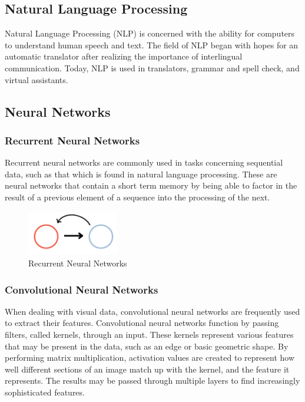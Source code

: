 \documentclass[11pt, a4paper, twocolumn]{article}
\begin{document}
\subsection{Natural Language Processing}
Natural Language Processing (NLP) is concerned with the ability for computers to understand human speech and text. The field of NLP began with hopes for an automatic translator after realizing the importance of interlingual communication. Today, NLP is used in translators, grammar and spell check, and virtual assistants. 

\subsection{Neural Networks}
\subsubsection{Recurrent Neural Networks}
Recurrent neural networks are commonly used in tasks concerning sequential data, such as that which is found in natural language processing. These are neural networks that contain a short term memory by being able to factor in the result of a previous element of a sequence into the processing of the next. 

\begin{figure}[htp]
    \centering
    \includegraphics[width=4cm]{rnn.png}
    \caption{Recurrent Neural Networks}
    \label{fig:rnn}
\end{figure}

\subsubsection{Convolutional Neural Networks}
When dealing with visual data, convolutional neural networks are frequently used to extract their features. Convolutional neural networks function by passing filters, called kernels, through an input. These kernels represent various features that may be present in the data, such as an edge or basic geometric shape. By performing matrix multiplication, activation values are created to represent how well different sections of an image match up with the kernel, and the feature it represents. The results may be passed through multiple layers to find increasingly sophisticated features.
\end{document}
